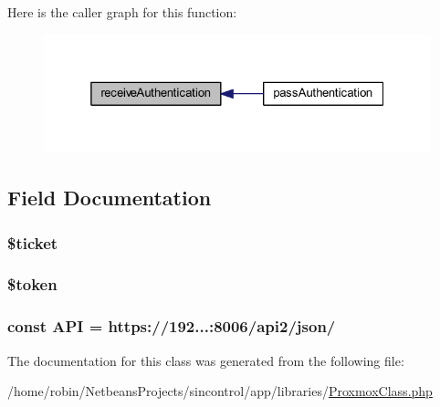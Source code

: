 Here is the caller graph for this function\+:
\nopagebreak
\begin{figure}[H]
\begin{center}
\leavevmode
\includegraphics[width=325pt]{class_proxmox_class_a98cee58b0d7b97b3959a09f529cfbb50_icgraph}
\end{center}
\end{figure}




\subsection{Field Documentation}
\hypertarget{class_proxmox_class_abf7832c7c53a3be2ca8a8fc305006bb0}{}
\subsubsection[{\$ticket}]{\setlength{\rightskip}{0pt plus 5cm}\$ticket\hspace{0.3cm}{\ttfamily [protected]}}\label{class_proxmox_class_abf7832c7c53a3be2ca8a8fc305006bb0}
\hypertarget{class_proxmox_class_a00ae4fcafb1145f5e968bdf920f83e2e}{}
\subsubsection[{\$token}]{\setlength{\rightskip}{0pt plus 5cm}\$token\hspace{0.3cm}{\ttfamily [protected]}}\label{class_proxmox_class_a00ae4fcafb1145f5e968bdf920f83e2e}
\hypertarget{class_proxmox_class_ad629fa048bd788fc4a4ed613628423cb}{}
\subsubsection[{A\+P\+I}]{\setlength{\rightskip}{0pt plus 5cm}const A\+P\+I = \textquotesingle{}https\+://192...\+:8006/api2/json/\textquotesingle{}}\label{class_proxmox_class_ad629fa048bd788fc4a4ed613628423cb}


The documentation for this class was generated from the following file\+:\begin{DoxyCompactItemize}
\item 
/home/robin/\+Netbeans\+Projects/sincontrol/app/libraries/\hyperlink{_proxmox_class_8php}{Proxmox\+Class.\+php}\end{DoxyCompactItemize}
